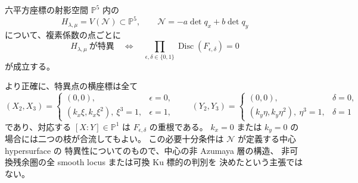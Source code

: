 \begin{theorem}
\label{ifn:thm:four-discriminants}
六平方座標の射影空間 $\mathbb P^5$ 内の
\[
  H_{\lambda,\mu}=V(\mathcal N)\subset\mathbb P^5,
  \qquad
  \mathcal N=-a\det q_x+b\det q_y
\]
について、複素係数の点ごとに
\begin{equation}\label{ifn:eq:exact-discriminant}
 H_{\lambda,\mu}\ \text{が特異}
 \quad\Longleftrightarrow\quad
 \prod_{\epsilon,\delta\in\{0,1\}}
   \operatorname{Disc}(F_{\epsilon,\delta})=0
\end{equation}
が成立する。

より正確に、特異点の横座標は全て
\begin{equation}\label{ifn:eq:critical-branches}
 (X_2,X_3)=
 \begin{cases}
 (0,0),&\epsilon=0,\\
 (k_x\xi,k_x\xi^2),\ \xi^3=1,&\epsilon=1,
 \end{cases}
 \qquad
 (Y_2,Y_3)=
 \begin{cases}
 (0,0),&\delta=0,\\
 (k_y\eta,k_y\eta^2),\ \eta^3=1,&\delta=1
 \end{cases}
\end{equation}
であり、対応する $[X:Y]\in\mathbb P^1$ は
$F_{\epsilon,\delta}$ の重根である。
$k_x=0$ または $k_y=0$ の場合には二つの枝が合流してもよい。
この必要十分条件は $\mathcal N$ が定義する中心 hypersurface の
特異性についてのもので、中心の非 Azumaya 層の構造、
非可換残余圏の全 smooth locus または可換 Ku 標的の判別を
決めたという主張ではない。
\end{theorem}

